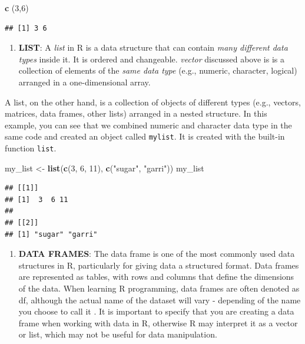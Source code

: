 \documentclass[
]{article}
\newenvironment{Shaded}{\begin{snugshade}}{\end{snugshade}}
\newcommand{\DecValTok}[1]{\textcolor[rgb]{0.00,0.00,0.81}{#1}}
\newcommand{\FunctionTok}[1]{\textcolor[rgb]{0.13,0.29,0.53}{\textbf{#1}}}
\newcommand{\NormalTok}[1]{#1}
\newcommand{\OtherTok}[1]{\textcolor[rgb]{0.56,0.35,0.01}{#1}}
\newcommand{\StringTok}[1]{\textcolor[rgb]{0.31,0.60,0.02}{#1}}
\providecommand{\tightlist}{%
  \setlength{\itemsep}{0pt}\setlength{\parskip}{0pt}}
\begin{document}
\begin{Shaded}
\begin{Highlighting}[]
\FunctionTok{c}\NormalTok{ (}\DecValTok{3}\NormalTok{,}\DecValTok{6}\NormalTok{)}
\end{Highlighting}
\end{Shaded}

\begin{verbatim}
## [1] 3 6
\end{verbatim}

\begin{enumerate}
\def\labelenumi{\arabic{enumi}.}
\setcounter{enumi}{3}
\tightlist
\item
  \textbf{LIST}: A \emph{list} in R is a data structure that can contain
  \emph{many different data types} inside it. It is ordered and
  changeable. \emph{vector} discussed above is is a collection of
  elements of the \emph{same data type} (e.g., numeric, character,
  logical) arranged in a one-dimensional array.
\end{enumerate}

A list, on the other hand, is a collection of objects of different types
(e.g., vectors, matrices, data frames, other lists) arranged in a nested
structure. In this example, you can see that we combined numeric and
character data type in the same code and created an object called
\texttt{mylist}. It is created with the built-in function \texttt{list}.

\begin{Shaded}
\begin{Highlighting}[]
\NormalTok{my\_list }\OtherTok{\textless{}{-}} \FunctionTok{list}\NormalTok{(}\FunctionTok{c}\NormalTok{(}\DecValTok{3}\NormalTok{, }\DecValTok{6}\NormalTok{, }\DecValTok{11}\NormalTok{), }\FunctionTok{c}\NormalTok{(}\StringTok{"sugar"}\NormalTok{, }\StringTok{"garri"}\NormalTok{))}
\NormalTok{my\_list}
\end{Highlighting}
\end{Shaded}

\begin{verbatim}
## [[1]]
## [1]  3  6 11
## 
## [[2]]
## [1] "sugar" "garri"
\end{verbatim}

\begin{enumerate}
\def\labelenumi{\arabic{enumi}.}
\setcounter{enumi}{4}
\tightlist
\item
  \textbf{DATA FRAMES}: The data frame is one of the most commonly used
  data structures in R, particularly for giving data a structured
  format. Data frames are represented as tables, with rows and columns
  that define the dimensions of the data. When learning R programming,
  data frames are often denoted as df, although the actual name of the
  dataset will vary - depending of the name you choose to call it . It
  is important to specify that you are creating a data frame when
  working with data in R, otherwise R may interpret it as a vector or
  list, which may not be useful for data manipulation.
\end{enumerate}
\end{document}
